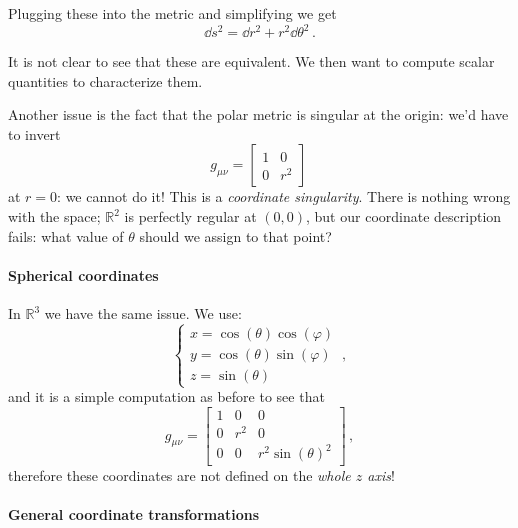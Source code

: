 \documentclass[main.tex]{subfiles}
\begin{document}
Plugging these into the metric and simplifying we get 
%
\begin{equation}
  \dd{s^2}  = \dd{r^2} + r^2 \dd{\theta^2} 
\,.
\end{equation}
%

It is not clear to see that these are equivalent.
We then want to compute scalar quantities to characterize them.

Another issue is the fact that the polar metric is singular at the origin: we'd have to invert 
%
\begin{equation}
  g_{\mu \nu } = \left[\begin{array}{cc}
  1 & 0 \\ 
  0 & r^2
  \end{array}\right]
\,
\end{equation}
%
at \(r=0\): we cannot do it! This is a \emph{coordinate singularity}. There is nothing wrong with the space; \(\mathbb{R}^{2} \) is perfectly regular at \((0,0)\), but our coordinate description fails: what value of \(\theta \) should we assign to that point? 

\paragraph{Spherical coordinates}
In \(\mathbb{R}^3 \) we have the same issue. We use: 
%
\begin{equation}
  \begin{cases}
      x = \cos(\theta ) \cos(\varphi ) \\
      y = \cos(\theta ) \sin(\varphi)  \\
      z = \sin(\theta ) 
  \end{cases}
\,,
\end{equation}
%
and it is a simple computation as before to see that 
%
\begin{equation}
  g_{\mu \nu }= \left[\begin{array}{ccc}
  1 & 0 & 0 \\ 
  0 & r^2 & 0 \\ 
  0 & 0 & r^2 \sin(\theta )^2
  \end{array}\right]
\,,
\end{equation}
%
therefore these coordinates are not defined on the \emph{whole \(z\) axis}!

\paragraph{General coordinate transformations}
\end{document}
